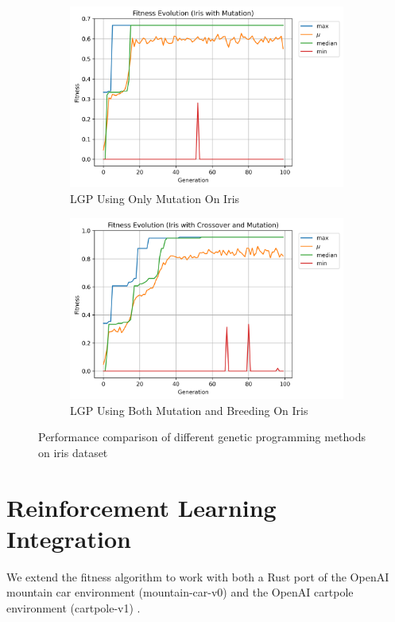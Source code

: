 \documentclass[12pt, final]{dalcsthesis}
\begin{document}
\begin{figure}
	\begin{subfigure}[b]{0.48\textwidth}
		\includegraphics[width=\textwidth]{iris_mutation.png}
		\caption{LGP Using Only Mutation On Iris}
		\label{fig:iris_mutation}
	\end{subfigure}
	\hfill
	\begin{subfigure}[b]{0.48\textwidth}
		\includegraphics[width=\textwidth]{iris_full.png}
		\caption{LGP Using Both Mutation and Breeding On Iris}
		\label{fig:iris_full}
	\end{subfigure}

	\caption{Performance comparison of different genetic programming methods on iris dataset}
	\label{fig:iris_comparison}
\end{figure}

\section{Reinforcement Learning Integration}
We extend the fitness algorithm to work with both a Rust port of the OpenAI mountain car environment (mountain-car-v0) \cite{1606.01540} and the OpenAI cartpole environment (cartpole-v1) \cite{1606.01540}.
\end{document}
